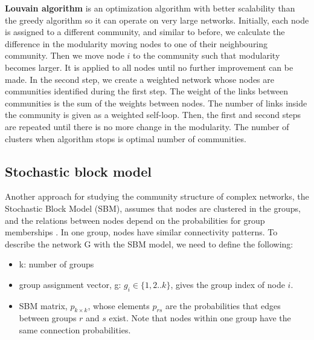 \textbf{Louvain algorithm} \cite{blondel2008fast} is an optimization algorithm with better scalability than the greedy algorithm so it can operate on very large networks. Initially, each node is assigned to a different community, and similar to before, we calculate the difference in the modularity moving nodes to one of their neighbouring community. Then we move node $i$ to the community such that modularity becomes larger. It is applied to all nodes until no further improvement can be made. In the second step, we create a weighted network whose nodes are communities identified during the first step. The weight of the links between communities is the sum of the weights between nodes. The number of links inside the community is given as a weighted self-loop. Then, the first and second steps are repeated until there is no more change in the modularity. The number of clusters when algorithm stops is optimal number of communities. 




\subsection{Stochastic block model}

Another approach for studying the community structure of complex networks, the Stochastic Block Model (SBM), assumes that nodes are clustered in the groups, and the relations between nodes depend on the probabilities for group memberships \cite{lee2019review}. In one group, nodes have similar connectivity patterns. To describe the network G with the SBM model, we need to define the following:

\begin{itemize}
	\item k: number of groups
	\item group assignment vector, g: $g_i \in\{1,2..k\}$, gives the group index of node $i$.
	\item SBM matrix, $p_{k \times k}$, whose elements $p_{rs}$ are the probabilities that edges between groups $r$ and $s$ exist. Note that nodes within one group have the same connection probabilities. 
\end{itemize}

